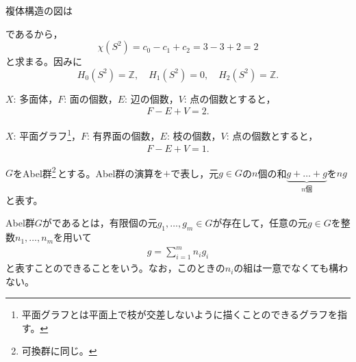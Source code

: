 \documentclass[uplatex]{jsarticle}
\begin{document}
\begin{rei}[2次元球面の例]
  複体構造の図は
  \begin{center}
  \end{center}
  であるから，
  \begin{equation}
    \chi (S^{2}) = c_{0} - c_{1} + c_{2} = 3 - 3 + 2 = 2
  \end{equation}
  と求まる。因みに
  \begin{equation}
    H_{0}(S^{2}) = \mathbb{Z}, \quad H_{1}(S^{2}) = 0, \quad H_{2}(S^{2}) = \mathbb{Z}.
  \end{equation}
\end{rei}

\begin{teiri}[Eulerの多面体定理]
  $X$: 多面体，$F$: 面の個数，$E$: 辺の個数，$V$: 点の個数とすると，
  \begin{align}
    F - E + V = 2.
  \end{align}
\end{teiri}

\begin{teiri}[平面グラフに関するEuler標数]
  $X$: 平面グラフ\footnote{平面グラフとは平面上で枝が交差しないように描くことのできるグラフを指す。}，$F$: 有界面の個数，$E$: 枝の個数，$V$: 点の個数とすると，
  \begin{align}
    F - E + V = 1.
  \end{align}
\end{teiri}

\sukima{}\par
$G$をAbel群\footnote{可換群に同じ。}\,とする。Abel群の演算を$+$で表し，元$g \in G$の$n$個の和$\underbrace{g + \dots + g}_{n\text{個}}$を$ng$と表す。

\begin{teigi}[有限生成]
  Abel群$G$がであるとは，有限個の元$g_{1}, \dots, g_{m} \in G$が存在して，任意の元$g \in G$を整数$n_{1}, \dots, n_{m}$を用いて
  \begin{align}
    g = \sum_{i=1}^{m} n_{i} g_{i}
  \end{align}
  と表すことのできることをいう。なお，このときの$n_{i}$の組は一意でなくても構わない。
\end{teigi}
\end{document}
